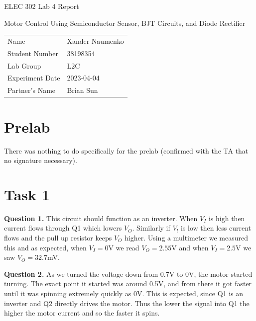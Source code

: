 \documentclass[letterpaper, reqno,11pt]{article}
\begin{document}
\begin{titlepage}
\centering


\Large ELEC 302 Lab 4 Report


\normalsize Motor Control Using Semiconductor Sensor, BJT Circuits, and Diode Rectifier


\begin{tabular}{ll}
Name & Xander Naumenko \\[2ex]
Student Number  & 38198354 \\[2ex]
Lab Group            & L2C \\[2ex]
Experiment Date            & 2023-04-04 \\[2ex]
Partner's Name &  Brian Sun
\end{tabular}



\end{titlepage}

\section{Prelab}

There was nothing to do specifically for the prelab (confirmed with the TA that no signature necessary).

\section{Task 1}
{\medskip\noindent\bf Question 1.} This circuit should function as an inverter. When $V_I$ is high then current flows through Q1 which lowers $V_O$. Similarly if $V_l$ is low then less current flows and the pull up resistor keeps $V_O$ higher. Using a multimeter we measured this and as expected, when $V_I=0$V we read $V_O=2.55$V and when $V_I=2.5$V we saw $V_O=32.7$mV.

{\medskip\noindent\bf Question 2.} As we turned the voltage down from $0.7$V to $0$V, the motor started turning. The exact point it started was around 0.5V, and from there it got faster until it was spinning extremely quickly as 0V. This is expected, since Q1 is an inverter and Q2 directly drives the motor. Thus the lower the signal into Q1 the higher the motor current and so the faster it spins.
\end{document}
